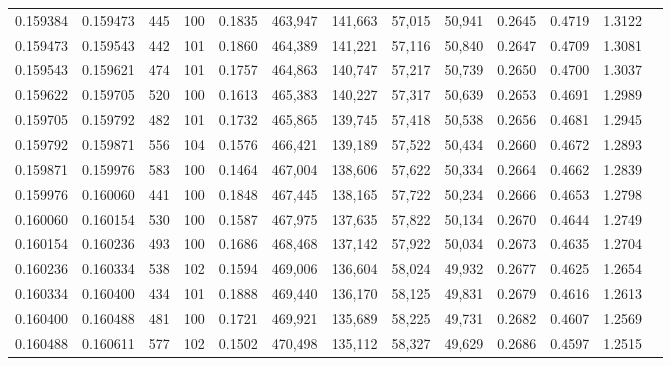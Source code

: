 \begin{tabular}{rrrrrrrrrrrrr}
0.159384 & 0.159473 &   445 & 100 &                                     0.1835 & 463,947 & 141,663 &  57,015 &  50,941 & 0.2645 & 0.4719 & 1.3122 \\
0.159473 & 0.159543 &   442 & 101 &                                     0.1860 & 464,389 & 141,221 &  57,116 &  50,840 & 0.2647 & 0.4709 & 1.3081 \\
0.159543 & 0.159621 &   474 & 101 &                                     0.1757 & 464,863 & 140,747 &  57,217 &  50,739 & 0.2650 & 0.4700 & 1.3037 \\
0.159622 & 0.159705 &   520 & 100 &                                     0.1613 & 465,383 & 140,227 &  57,317 &  50,639 & 0.2653 & 0.4691 & 1.2989 \\
0.159705 & 0.159792 &   482 & 101 &                                     0.1732 & 465,865 & 139,745 &  57,418 &  50,538 & 0.2656 & 0.4681 & 1.2945 \\
0.159792 & 0.159871 &   556 & 104 &                                     0.1576 & 466,421 & 139,189 &  57,522 &  50,434 & 0.2660 & 0.4672 & 1.2893 \\
0.159871 & 0.159976 &   583 & 100 &                                     0.1464 & 467,004 & 138,606 &  57,622 &  50,334 & 0.2664 & 0.4662 & 1.2839 \\
0.159976 & 0.160060 &   441 & 100 &                                     0.1848 & 467,445 & 138,165 &  57,722 &  50,234 & 0.2666 & 0.4653 & 1.2798 \\
0.160060 & 0.160154 &   530 & 100 &                                     0.1587 & 467,975 & 137,635 &  57,822 &  50,134 & 0.2670 & 0.4644 & 1.2749 \\
0.160154 & 0.160236 &   493 & 100 &                                     0.1686 & 468,468 & 137,142 &  57,922 &  50,034 & 0.2673 & 0.4635 & 1.2704 \\
0.160236 & 0.160334 &   538 & 102 &                                     0.1594 & 469,006 & 136,604 &  58,024 &  49,932 & 0.2677 & 0.4625 & 1.2654 \\
0.160334 & 0.160400 &   434 & 101 &                                     0.1888 & 469,440 & 136,170 &  58,125 &  49,831 & 0.2679 & 0.4616 & 1.2613 \\
0.160400 & 0.160488 &   481 & 100 &                                     0.1721 & 469,921 & 135,689 &  58,225 &  49,731 & 0.2682 & 0.4607 & 1.2569 \\
0.160488 & 0.160611 &   577 & 102 &                                     0.1502 & 470,498 & 135,112 &  58,327 &  49,629 & 0.2686 & 0.4597 & 1.2515 \\

\end{tabular}
